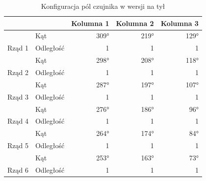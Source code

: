 \begin{table}[!h]
\centering
\caption{Konfiguracja pól czujnika w wersji na tył}
\begin{tabular}{|l|l|rrr|}
\hline
\multicolumn{1}{|l|}{}     &                                   & \multicolumn{1}{c|}{Kolumna 1} & \multicolumn{1}{c|}{Kolumna 2} & \multicolumn{1}{c|}{Kolumna 3} \\
\hline  & \cellcolor[HTML]{C0C0C0}Kąt       & \cellcolor[HTML]{C0C0C0}309°  & \cellcolor[HTML]{C0C0C0}219°  & \cellcolor[HTML]{C0C0C0}129°  \\
\multirow{-2}{*}{Rząd 1} & \cellcolor[HTML]{EFEFEF}Odległość & \cellcolor[HTML]{EFEFEF}1   & \cellcolor[HTML]{EFEFEF}1   & \cellcolor[HTML]{EFEFEF}1   \\ 
    & \cellcolor[HTML]{C0C0C0}Kąt       & \cellcolor[HTML]{C0C0C0}298°  & \cellcolor[HTML]{C0C0C0}208°  & \cellcolor[HTML]{C0C0C0}118°  \\
\multirow{-2}{*}{Rząd 2} & \cellcolor[HTML]{EFEFEF}Odległość & \cellcolor[HTML]{EFEFEF}1   & \cellcolor[HTML]{EFEFEF}1   & \cellcolor[HTML]{EFEFEF}1   \\ 
    & \cellcolor[HTML]{C0C0C0}Kąt       & \cellcolor[HTML]{C0C0C0}287°  & \cellcolor[HTML]{C0C0C0}197°  & \cellcolor[HTML]{C0C0C0}107°  \\
\multirow{-2}{*}{Rząd 3} & \cellcolor[HTML]{EFEFEF}Odległość & \cellcolor[HTML]{EFEFEF}1   & \cellcolor[HTML]{EFEFEF}1   & \cellcolor[HTML]{EFEFEF}1   \\ 
    & \cellcolor[HTML]{C0C0C0}Kąt       & \cellcolor[HTML]{C0C0C0}276°  & \cellcolor[HTML]{C0C0C0}186°  & \cellcolor[HTML]{C0C0C0}96°   \\
\multirow{-2}{*}{Rząd 4} & \cellcolor[HTML]{EFEFEF}Odległość & \cellcolor[HTML]{EFEFEF}1   & \cellcolor[HTML]{EFEFEF}1   & \cellcolor[HTML]{EFEFEF}1   \\ 
    & \cellcolor[HTML]{C0C0C0}Kąt       & \cellcolor[HTML]{C0C0C0}264°  & \cellcolor[HTML]{C0C0C0}174°  & \cellcolor[HTML]{C0C0C0}84°   \\
\multirow{-2}{*}{Rząd 5} & \cellcolor[HTML]{EFEFEF}Odległość & \cellcolor[HTML]{EFEFEF}1   & \cellcolor[HTML]{EFEFEF}1   & \cellcolor[HTML]{EFEFEF}1   \\ 
    & \cellcolor[HTML]{C0C0C0}Kąt       & \cellcolor[HTML]{C0C0C0}253°  & \cellcolor[HTML]{C0C0C0}163°  & \cellcolor[HTML]{C0C0C0}73°   \\
\multirow{-2}{*}{Rząd 6} & \cellcolor[HTML]{EFEFEF}Odległość & \cellcolor[HTML]{EFEFEF}1   & \cellcolor[HTML]{EFEFEF}1   & \cellcolor[HTML]{EFEFEF}1   \\ 

\end{tabular}
\end{table}

